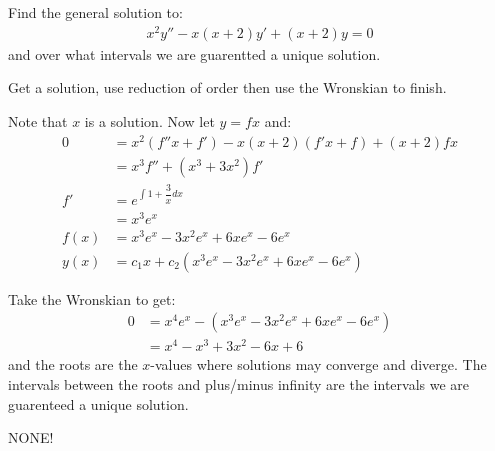 \documentclass[11pt]{article}
\begin{document}
    \newpage \setcounter{equation}{-1} \begin{problem} [Problem 4]
        Find the general solution to:
        \begin{align}
            x^2y''- x(x + 2)y' + (x + 2)y = 0
        \end{align}
        and over what intervals we are guarentted a unique solution.
    \end{problem}
        \begin{remark}[Method.]
            Get a solution, use reduction of order then use the Wronskian to finish.
        \end{remark}
        \begin{solution}[Solution 4a]
            Note that $x$ is a solution. Now let $y = fx$ and:
            \begin{align}
                0 &= x^2(f''x + f') - x(x+2)(f'x + f) + (x+2)fx \\
                &= x^3f'' + (x^3+3x^2)f' \\
                f' &= e^{\int 1 + \dfrac{3}{x} dx} \\
                &= x^3e^x \\
                f(x) &= x^3e^x - 3x^2e^x + 6xe^x - 6e^x \\ 
                y(x) &= c_1x + c_2(x^3e^x - 3x^2e^x + 6xe^x - 6e^x)
            \end{align}
        \end{solution}
        \begin{solution}[Solution 4b]
            Take the Wronskian to get:
            \begin{align}
                0 &= x^4e^{x} -( x^3e^x - 3x^2e^x + 6xe^x - 6e^x) \\
                &= x^4 - x^3 + 3x^2 - 6x + 6 
            \end{align}
            and the roots are the $x$-values where solutions may converge and diverge. The intervals between the roots and plus/minus infinity are the 
            intervals we are guarenteed a unique solution.
        \end{solution}
        \begin{remark}[Footnotes.]
            NONE!
        \end{remark}
\end{document}
